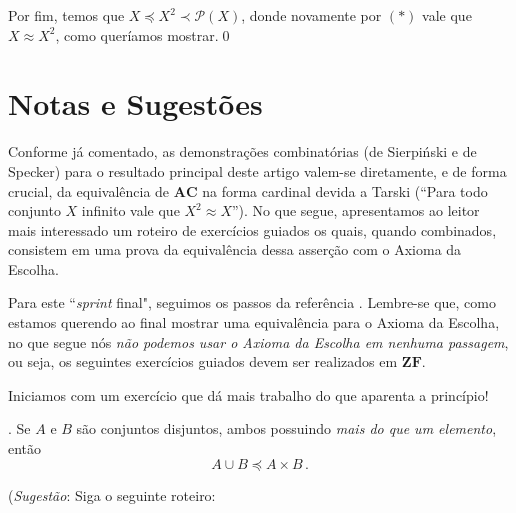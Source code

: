 \documentclass{hipatia}
\newcommand{\n}{\noindent}
\newcommand{\equip}{\approx}
\newcommand{\partes}[1]{\mathcal{P}(#1)}
\newcommand{\preccurlyneq}{\prec}
\newcommand{\ac}{\mathbf{AC}}
\newcommand{\zf}{\mathbf{ZF}}
\newcommand{\dominado}{\preccurlyeq}
\begin{document}
Por fim, temos que $X\preccurlyeq
X^2\preccurlyneq\partes{X}$, donde novamente por
$(\ast)$ vale que $X\approx X^2$, como queríamos
mostrar.\qed


\section{Notas e Sugestões}

Conforme já comentado, as demonstrações
combinatórias (de Sierpi\'nski e de Specker)  para
o resultado principal deste artigo valem-se
diretamente, e de forma crucial, da equivalência
de $\ac$ na forma cardinal devida a Tarski (``Para
todo conjunto  $X$ infinito vale que $X^2 \equip
X$''). No que segue, apresentamos ao leitor mais
interessado um roteiro de exercícios guiados os
quais, quando combinados, consistem em uma prova
da equivalência dessa asserção com o Axioma da
Escolha. 

Para este ``\emph{sprint} final", seguimos os
passos da referência \cite{JechAC}. Lembre-se que,
como estamos querendo ao final mostrar uma
equivalência para o Axioma da Escolha, no que
segue nós {\it não podemos usar o Axioma da
Escolha em nenhuma passagem}, ou seja, os
seguintes exercícios guiados devem ser realizados
em $\zf$.

Iniciamos com um exercício que dá mais trabalho do
que aparenta a princípio!

\n {\bf Exercício 0}. Se $A$ e $B$ são conjuntos
disjuntos, ambos possuindo {\it mais do que um
elemento}, então $$A \cup B \dominado A \times
B\,.$$

({\it Sugestão}: Siga o seguinte roteiro:
\end{document}
